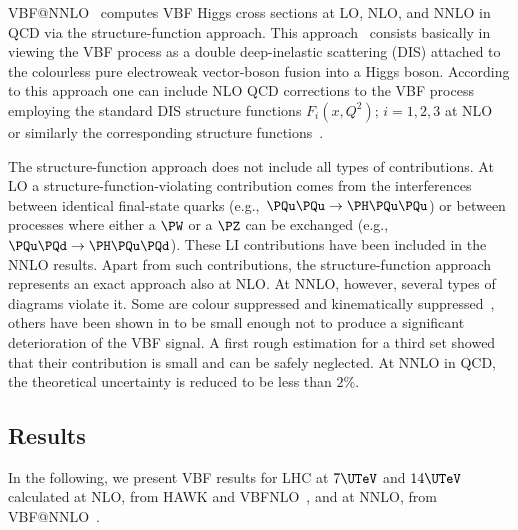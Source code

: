 %
%
{\sc VBF@NNLO}~\cite{Bolzoni:2010xr} computes VBF Higgs cross sections 
at LO, NLO, and NNLO in QCD via the structure-function approach.  This
approach~\cite{Han:1992hr} consists basically in viewing the VBF process as a
double deep-inelastic scattering (DIS) attached to the colourless pure
electroweak vector-boson fusion into a Higgs boson.  According to this
approach one can include NLO QCD corrections to the VBF process employing the
standard DIS structure functions $F_i(x,Q^2);\,i=1,2,3$ at
NLO~\cite{Bardeen:1978yd} or similarly the corresponding structure
functions~\cite{Kazakov:1990fu,Zijlstra:1992kj,Zijlstra:1992qd,Moch:1999eb}.

The structure-function approach does not include all types of contributions.
At LO a structure-function-violating contribution comes from the
interferences between identical final-state quarks (e.g.,\
$\PQu\PQu\rightarrow \PH\PQu\PQu$) or between processes where either a $\PW$
or a $\PZ$ can be exchanged (e.g.,\ $\PQu\PQd\rightarrow \PH\PQu\PQd$).  These
LI contributions have been included in the NNLO results. Apart from such
contributions, the structure-function approach represents an exact approach
also at NLO.  At NNLO, however, several types of diagrams violate it.  Some
are colour suppressed and kinematically
suppressed~\cite{vanNeerven:1984ak,Blumlein:1992eh,Figy:2007kv}, others have
been shown in \Bref{Harlander:2008xn} to be small enough not to produce
a significant deterioration of the VBF signal.  A first rough estimation for
a third set showed that their contribution is small and can be safely
neglected.  At NNLO in QCD, the theoretical uncertainty is reduced to be less
than $2\%$.


\subsection{Results}
In the following, we present VBF results for LHC at $7\UTeV$ and $14\UTeV$
calculated at NLO, from {\sc HAWK} and {\sc VBFNLO}~\cite{webVBFNLO}, and at
NNLO, from {\sc VBF@NNLO}~\cite{WebInterface:2010}.

